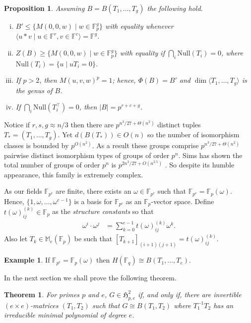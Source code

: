 \documentclass[11pt]{article}
\numberwithin{equation}{section}
\theoremstyle{definition}
\theoremstyle{plain}
\numberwithin{equation}{section}
\theoremstyle{plain}       %
\newtheorem{thm}[equation]{Theorem}
\newtheorem{prop}[equation]{Proposition}
\theoremstyle{remark}
\theoremstyle{definition}
\newtheorem{ex}[equation]{Example}  %
\numberwithin{figure}{section}
\numberwithin{table}{section}
\newcommand{\mygroups}{\mathfrak{H}}
\newcommand{\bbF}{\mathbb{F}}  %
\begin{document}
\begin{prop}\label{prop:basics}
	Assuming $B=B(T_1,\ldots,T_g)$ the following hold.
\begin{enumerate}[(i)]
	\item $B'\leq \{ M(0,0,w)\mid w\in \bbF^g_p\}$ with equality whenever
	$\langle u*v\mid u\in\bbF^r,v\in\bbF^c \rangle=\bbF^g$.
	\item $Z(B)\geq \{ M(0,0,w)\mid w\in \bbF^g_p\}$ with equality if 
	$\bigcap_i \mathrm{Null}(T_i)=0$, where $\mathrm{Null}(T_i)=\{u\mid uT_i=0\}$.
	\item If $p>2$, then $M(u,v,w)^p=1$; hence, $\Phi(B)=B'$ and $\dim \langle T_1,\ldots,T_g\rangle$ is the genus of $B$.
	\item If $\bigcap_i \mathrm{Null}(T_i^{\top})=0$, then $|B|=p^{r+c+g}$.
\end{enumerate}
\end{prop}

Notice if $r,s,g\approx n/3$ then there are $p^{n^3/27+\Theta(n^2)}$ distinct
tuples $T_*=(T_1,\ldots,T_g)$.  Yet $d(B(T_*))\in O(n)$ so the number of
isomorphism classes is bounded by $p^{O(n^2)}$.  As a result these groups
comprise $p^{n^3/27+\Theta(n^2)}$ pairwise distinct isomorphism types of groups
of order $p^n$.  Sims has shown the total number of groups of order $p^n$ is
$p^{2n^3/27+O(n^{2.5})}$ \cite[Chapters~4 \& 5]{BNV:enum}. So despite its humble
appearance, this family is extremely complex. 

As our fields $\bbF_{p^e}$ are finite, there exists an $\omega\in \bbF_{p^e}$
such that $\bbF_{p^e}=\bbF_p(\omega)$.  Hence, $\{1,\omega,\dots,\omega^{e-1}\}$
is a basis for $\bbF_{p^e}$ as an $\bbF_p$-vector space.  Define
$t(\omega)_{ij}^{(k)}\in\bbF_p$ as the \emph{structure constants} so that
\begin{align*}
	\omega^i\cdot \omega^j &= \sum_{k=0}^{e-1} t(\omega)_{ij}^{(k)} \omega^k.
\end{align*}
Also let $T_k\in\mathbb{M}_e(\bbF_p)$ be such that  $[T_{k+1}]_{(i+1)(j+1)}=t(\omega)_{ij}^{(k)}$. 
\begin{ex}
If $\bbF_{p^e}=\bbF_p(\omega)$ then $H(\bbF_q)  \cong B(T_1, \dots, T_e)$.
\end{ex}

In the next section we shall prove the following theorem.
\begin{thm}\label{thm:genus-2}
	For primes $p$ and $e$, $G\in \mygroups_{p,e}^{2}$ if, and only if, there
	are invertible $(e\times e)$-matrices $(T_1,T_2)$ such that $G\cong
	B(T_1,T_2)$ where $T_1^{-1}T_2$ has an irreducible minimal polynomial of
	degree $e$.
\end{thm}
\end{document}
